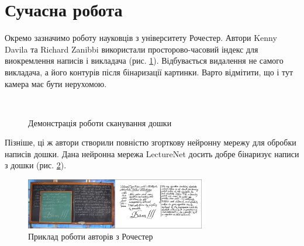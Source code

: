 \section{Сучасна робота}
Окремо зазначимо роботу \cite{bib:davila:2017}
науковців з університету Рочестер. Автори Kenny Davila та Richard Zanibbi
використали просторово-часовий індекс для виокремлення написів і викладача (рис. \ref{fig:davila:2017}).
Відбувається видалення не самого викладача,  а його контурів після бінаризації картинки.
Варто відмітити, що і тут камера має бути нерухомою.
\begin{figure}[H]
  \centering
  \\
  \caption{Демонстрація роботи сканування дошки \cite{bib:davila:2017}
    \label{fig:davila:2017}
  }
\end{figure}
Пізніше, ці ж автори створили повністю згорткову нейронну мережу \cite{bib:davila:2021}
для обробки написів дошки. Дана нейронна мережа LectureNet досить добре бінаризує написи з дошки
(рис. \ref{fig:davila:2021}).
\begin{figure}[H]
  \centering
  \includegraphics[width=0.7\textwidth]{images/davila_2021}
  \caption{Приклад роботи авторів з Рочестер \cite{bib:davila:2021}}
  \label{fig:davila:2021}
\end{figure}

\clearpage
